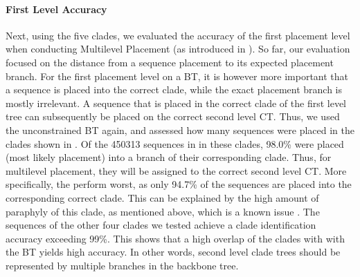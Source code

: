 \paragraph{First Level Accuracy}
\label{ch:AutomaticTrees:sec:Evaluation:sub:MultilevelPlacement:par:FirstLevelAccuracy}

Next, using the five clades, we evaluated the accuracy of the first placement level when conducting Multilevel Placement
(as introduced in ).
So far, our evaluation focused on the distance from a sequence placement to its expected placement branch.
For the first placement level on a \acf{BT}, it is however more important that a sequence is placed into the correct clade,
while the exact placement branch is mostly irrelevant.
A sequence that is placed in the correct clade of the first level tree
can subsequently be placed on the correct second level \acf{CT}.
Thus, we used the unconstrained  \ac{BT} again,
and assessed how many sequences were placed in the clades shown in .
Of the \num{450 313} sequences in  in these clades, %
98.0\% were placed (most likely placement) into a branch of their corresponding clade.
Thus, for multilevel placement, they will be assigned to the correct second level \acf{CT}.
More specifically, the  perform worst,
as only 94.7\% of the  sequences are placed into the corresponding correct clade.
This can be explained by the high amount of paraphyly of this clade, as mentioned above,
which is a known issue \cite{Parks2018}. %
The sequences of the other four clades we tested achieve a clade identification accuracy exceeding 99\%.
This shows that a high overlap of the clades with with the \ac{BT} yields high accuracy.
In other words, second level clade trees should be represented by multiple branches in the backbone tree.


